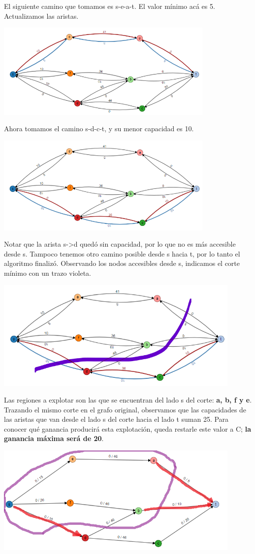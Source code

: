 El siguiente camino que tomamos es s-e-a-t. El valor mínimo acá es 5. Actualizamos las aristas.
\begin{center}
    \includegraphics[width=0.8\textwidth]{Informe/Imagenes/Parte 2/ej3.png}
    \end{center}
Ahora tomamos el camino s-d-c-t, y su menor capacidad es 10. 
    \begin{center}
    \includegraphics[width=0.8\textwidth]{Informe/Imagenes/Parte 2/ej4.png}
    \end{center}
Notar que la arista s->d quedó sin capacidad, por lo que no es más accesible desde s. Tampoco tenemos otro camino posible desde s hacia t, por lo tanto el algoritmo finalizó. Observando los nodos accesibles desde s, indicamos el corte mínimo con un trazo violeta. 
    \begin{center}
    \includegraphics[width=0.9\textwidth]{Informe/Imagenes/Parte 2/ej5cm.png}
    \end{center}
Las regiones a explotar son las que se encuentran del lado s del corte:  \textbf{a, b, f y e}. Trazando el mismo corte en el grafo original, observamos que las capacidades de las aristas que van desde el lado s del corte hacia el lado t suman 25. Para conocer qué ganancia producirá esta explotación, queda restarle este valor a C; \textbf{la ganancia máxima será de 20}.
    \begin{center}
    \includegraphics[width=0.9\textwidth]{Informe/Imagenes/Parte 2/ej6.png}
    \end{center}